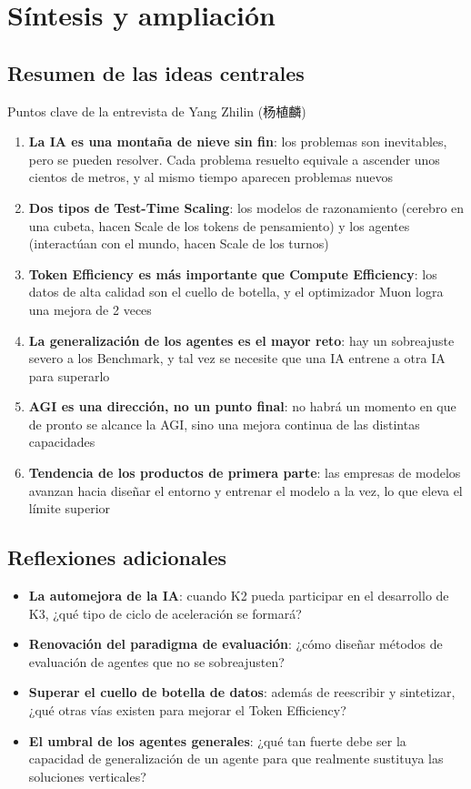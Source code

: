 \section{Síntesis y ampliación}

\subsection{Resumen de las ideas centrales}

\begin{importantbox}{Puntos clave de la entrevista de Yang Zhilin (杨植麟)}
\begin{enumerate}
    \item \textbf{La IA es una montaña de nieve sin fin}: los problemas son inevitables, pero se pueden resolver. Cada problema resuelto equivale a ascender unos cientos de metros, y al mismo tiempo aparecen problemas nuevos
    \item \textbf{Dos tipos de Test-Time Scaling}: los modelos de razonamiento (cerebro en una cubeta, hacen Scale de los tokens de pensamiento) y los agentes (interactúan con el mundo, hacen Scale de los turnos)
    \item \textbf{Token Efficiency es más importante que Compute Efficiency}: los datos de alta calidad son el cuello de botella, y el optimizador Muon logra una mejora de 2 veces
    \item \textbf{La generalización de los agentes es el mayor reto}: hay un sobreajuste severo a los Benchmark, y tal vez se necesite que una IA entrene a otra IA para superarlo
    \item \textbf{AGI es una dirección, no un punto final}: no habrá un momento en que de pronto se alcance la AGI, sino una mejora continua de las distintas capacidades
    \item \textbf{Tendencia de los productos de primera parte}: las empresas de modelos avanzan hacia diseñar el entorno y entrenar el modelo a la vez, lo que eleva el límite superior
\end{enumerate}
\end{importantbox}

\subsection{Reflexiones adicionales}

\begin{itemize}
    \item \textbf{La automejora de la IA}: cuando K2 pueda participar en el desarrollo de K3, ¿qué tipo de ciclo de aceleración se formará?
    \item \textbf{Renovación del paradigma de evaluación}: ¿cómo diseñar métodos de evaluación de agentes que no se sobreajusten?
    \item \textbf{Superar el cuello de botella de datos}: además de reescribir y sintetizar, ¿qué otras vías existen para mejorar el Token Efficiency?
    \item \textbf{El umbral de los agentes generales}: ¿qué tan fuerte debe ser la capacidad de generalización de un agente para que realmente sustituya las soluciones verticales?
\end{itemize}

